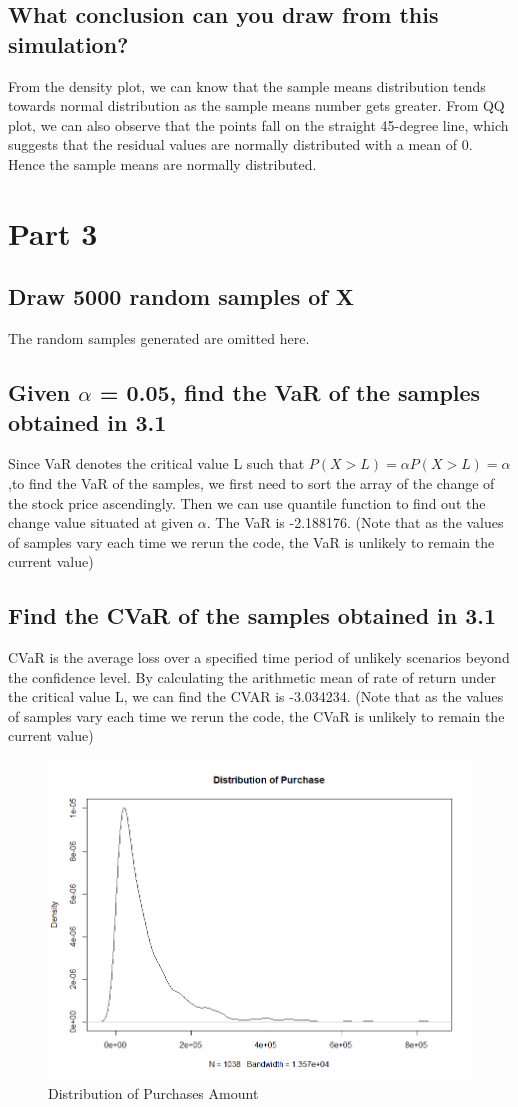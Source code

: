 \documentclass[12pt]{article}
\begin{document}
\subsection{What conclusion can you draw from this simulation?}
From the density plot, we can know that the sample means distribution tends towards normal distribution as the sample means number gets greater. From QQ plot, we can also observe that the points fall on the straight 45-degree line, which suggests that the residual values are normally distributed with a mean of 0. Hence the sample means are normally distributed.

\section{Part 3}
\subsection{Draw 5000 random samples of X}
The random samples generated are omitted here.

\subsection{Given $\alpha$ = 0.05, find the VaR of the samples obtained in 3.1}
Since VaR denotes the critical value L such that $P(X>L)=\alpha P(X>L)=\alpha$ ,to find the VaR of the samples, we first need to sort the array of the change of the stock price ascendingly. Then we can use quantile function to find out the change value situated at given $\alpha$. The VaR is -2.188176. (Note that as the values of samples vary each time we rerun the code, the VaR is unlikely to remain the current value)

\subsection{Find the CVaR of the samples obtained in 3.1}
CVaR is the average loss over a specified time period of unlikely scenarios beyond the confidence level. By calculating the arithmetic mean of rate of return under the critical value L, we can find the CVAR is -3.034234. (Note that as the values of samples vary each time we rerun the code, the CVaR is unlikely to remain the current value)

\begin{figure}
	\centering
	\includegraphics[width=.8\textwidth,height=.38\textwidth]{Rplot11.png}
	\caption{Distribution of Purchases Amount}
\end{figure}
\end{document}
